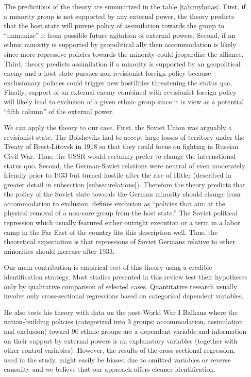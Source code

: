 The predictions of the theory are summarized in the table \ref{tab:mylonas}. First, if a minority group is not supported by any external power, the theory predicts that the host state will pursue policy of assimilation towards the group to \enquote{immunize} it from possible future  agitation  of external powers. Second, if an ethnic minority is supported by geopolitical ally then accommodation is likely since more repressive policies towards the minority could jeopardize the alliance. Third, theory predicts assimilation if a minority is supported by an geopolitical enemy and a host state pursues non-revisionist foreign policy because exclusionary policies could trigger new hostilities threatening the status quo. 
Finally, support of an external enemy combined with revisionist foreign policy will likely lead to exclusion of a given ethnic group since it is view as a potential \enquote{fifth column} of the external power. 



We can apply the theory to our case. First, the Soviet Union was arguably a revisionist state. The Bolsheviks had to accept large losses of territory under the Treaty of Brest-Litovsk in 1918 so that they could focus on fighting in Russian Civil War. Thus, the USSR would certainly prefer to change the international status quo. Second, the German-Soviet relations were neutral of even moderately friendly prior to 1933 but turned hostile after the rise of Hitler (described in greater detail in subsection \ref{subsec:relations}). Therefore the theory predicts that the policy 
of the Soviet state towards the German minority should change from accommodation to exclusion. \citet[p. 22]{mylonas_politics_2013} defines exclusion as \enquote{policies that aim at the physical removal of a non-core group from the host state.} The Soviet political repression which usually featured either outright execution or a term in a labor camp in the Far East of the country fits this description well. Thus, the theoretical expectation is that  repressions of Soviet Germans relative to other minorities should increase after 1933. 

Our main contribution is empirical test of this theory using a credible identification strategy. Most studies presented in this review test their hypotheses only by qualitative comparison of selected cases. Quantitative research usually involve only cross-sectional regressions based on categorical dependent variables.    

He also tests his theory with data on the post-World War I Balkans where the nation-building policies (categorized into 3 groups: accommodation, assimilation and exclusion)  toward  90 ethnic groups are a dependent variable and information on their support by external powers is an explanatory variables (together with other control variables). However, the results of the cross-sectional regression, used in the study, might easily be biased due to omitted variables or reverse causality and we believe that our approach offers cleaner identification.

